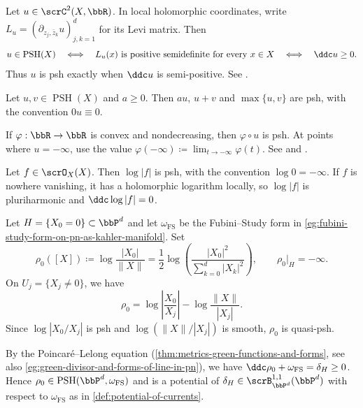 \begin{example}[label=\labelNFM{eg:c2-function-is-psh-iff-ddc-has-semi-definite-matrix}, status=draft, tag=0000000]
	Let $u \in \scrC^2(X,\bbR)$.
	In local holomorphic coordinates, write $L_u = (\partial_{z_j,\bar z_k}u)_{j,k = 1}^d$ for its Levi matrix.
	Then
	\[ u \in \operatorname{PSH}(X) \quad\Longleftrightarrow\quad L_u(x) \text{ is positive semidefinite for every }x \in X \quad\Longleftrightarrow\quad \ddc u \geq 0. \]
	Thus $u$ is psh exactly when $\ddc u$ is semi-positive.
	See \cite[Chapter~I, \S 5.A, the discussion preceding Theorem~5.8]{Demailly-2012-ComplexAnalyticDifferential}.
\end{example}

\begin{example}[label=\labelNFM{eg:sum-max-convex-composition-of-psh-is-psh}, status=draft, tag=0000000]
	Let $u,v \in \operatorname{PSH}(X)$ and $a \geq 0$.
	Then $au$, $u+v$ and $\max\{u,v\}$ are psh, with the convention $0u \equiv 0$.

	If $\varphi : \bbR \to \bbR$ is convex and nondecreasing, then $\varphi\circ u$ is psh.
	At points where $u = -\infty$, use the value $\varphi(-\infty) \coloneqq \lim_{t \to -\infty}\varphi(t)$.
	See \cite[Proposition 6.2.5]{Dinh-Sibony-2005-IntroductionTheoryCurrents} and
  \cite[Chapter~I, \S 5.A, Theorem~5.6]{Demailly-2012-ComplexAnalyticDifferential}.
\end{example}

\begin{example}[label=\labelNFM{eg:log-holomorphic-is-psh}, status=draft, tag=0000000]
  Let $f \in \scrO_X(X)$.
  Then $\log|f|$ is psh, with the convention $\log 0 = -\infty$.
  If $f$ is nowhere vanishing, it has a holomorphic logarithm locally,
  so $\log|f|$ is pluriharmonic and $\ddc\log|f| = 0$.
\end{example}

\begin{example}[label=\labelNFM{eg:green-function-of-lines-is-psh}, status=draft, tag=0000000]
	Let $H = \{X_0 = 0\} \subset \bbP^d$ and let $\omega_{\mathrm{FS}}$ be the Fubini--Study form in \cref{eg:fubini-study-form-on-pn-as-kahler-manifold}.
	Set
	\[ \rho_0([X]) \coloneqq \log\frac{|X_0|}{\|X\|} = \frac{1}{2} \log\left(\frac{|X_0|^2}{\sum_{k = 0}^d |X_k|^2}\right), \qquad \rho_0|_H = -\infty. \]
	On $U_j = \{X_j \neq 0\}$, we have
	\[ \rho_0 = \log\left|\frac{X_0}{X_j}\right| - \log\frac{\|X\|}{|X_j|}. \]
	Since $\log|X_0/X_j|$ is psh and $\log(\|X\|/|X_j|)$ is smooth,
	$\rho_0$ is quasi-psh.

  By the Poincar\'e--Lelong equation (\cref{thm:metrics-green-functions-and-forms}, see also \cref{eg:green-divisor-and-forms-of-line-in-pn}), we have $\ddc \rho_0 + \omega_{\mathrm{FS}} = \delta_H \geq 0$.
  Hence $\rho_0 \in \operatorname{PSH}(\bbP^d,\omega_{\mathrm{FS}})$ and is a potential of $\delta_H \in \scrB_{\bbP^d}^{1,1}(\bbP^d)$ with respect to $\omega_{\mathrm{FS}}$ as in \cref{def:potential-of-currents}.
\end{example}


